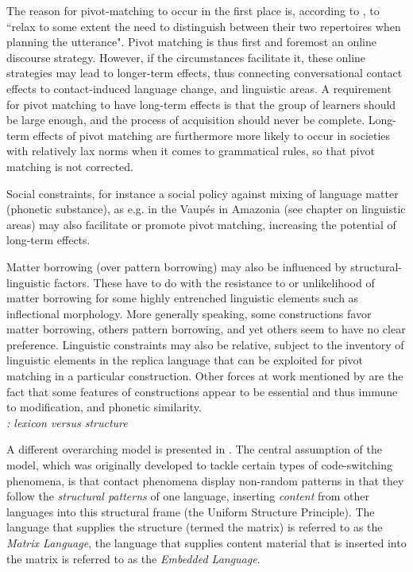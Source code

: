The reason for pivot-matching to occur in the first place is, according to \textcite[832]{matras&sakel2007}, to ``relax to some extent the need to distinguish
between their two repertoires when planning the utterance". Pivot matching is thus first and foremost an online discourse strategy. However, if the circumstances facilitate it, these online strategies may lead to longer-term effects, thus connecting conversational contact effects to contact-induced language change, and linguistic areas. A requirement for pivot matching to have long-term effects is that the group of learners should be large enough, and the process of acquisition should never be complete. Long-term effects of pivot matching are furthermore more likely to occur in societies with relatively lax norms when it comes to grammatical rules, so that pivot matching is not corrected.

Social constraints, for instance a social policy against mixing of language matter (phonetic substance), as e.g. in the Vaupés in Amazonia (see chapter on linguistic areas) may also facilitate or promote pivot matching, increasing the potential of long-term effects.

Matter borrowing (over pattern borrowing) may also be influenced by structural-linguistic factors. These have to do with the resistance to or unlikelihood of matter borrowing for some highly entrenched linguistic elements such as inflectional morphology. More generally speaking, some constructions favor matter borrowing, others pattern borrowing, and yet others seem to have no clear preference. Linguistic constraints may also be relative, subject to the inventory of linguistic elements in the replica language that can be exploited for pivot matching in a particular construction. Other forces at work mentioned by \cite{matras&sakel2007} are the fact that some features of constructions appear to be essential and thus immune to modification, and phonetic similarity.\\

\noindent \emph{\cite{myersetal2009universal}: lexicon versus structure}

\noindent A different overarching model is presented in \cite{myersetal2009universal}. The central assumption of the model, which was originally developed to tackle certain types of code-switching phenomena, is that contact phenomena display non-random patterns in that they follow the \emph{structural patterns} of one language, inserting \emph{content} from other languages into this structural frame (the Uniform Structure Principle). The language that supplies the structure (termed the matrix) is referred to as the \emph{Matrix Language}, the language that supplies content material that is inserted into the matrix is referred to as the \emph{Embedded Language}.

